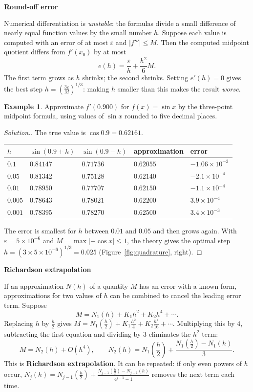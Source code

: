 \documentclass[11pt,a4paper]{article}
\numberwithin{equation}{section}
\theoremstyle{definition}
\newtheorem{exa}[thm]{Example}
\newenvironment{solution}
  {\renewcommand{\qedsymbol}{}\begin{proof}[\textit{Solution}.]}
  {\end{proof}}
\newcommand{\subhead}[1]{%
  \par\medskip\noindent\textbf{#1}\par\nobreak\smallskip}
\begin{document}
\subhead{Round-off error}
Numerical differentiation is \emph{unstable}: the formulas divide a small difference of nearly equal function values by the small number
$h$. Suppose each value is computed with an error of at most $\varepsilon$ and $|f'''|\leq M$. Then the computed midpoint quotient differs from
$f'(x_0)$ by at most
\begin{equation}\label{eq:diffround}
e(h) = \frac{\varepsilon}{h}+\frac{h^2}{6}M .
\end{equation}
The first term grows as $h$ shrinks; the second shrinks. Setting $e'(h) = 0$ gives the best step $h = \left(\frac{3\varepsilon}{M}\right)^{1/3}$: making $h$
smaller than this makes the result \emph{worse}.

\begin{exa}
\label{exa:diffround}
Approximate $f'(0.900)$ for $f(x) = \sin x$ by the three-point midpoint formula, using values of $\sin x$ rounded to five decimal places.
\end{exa}

\begin{solution}
The true value is $\cos0.9 = 0.62161$.
\begin{center}
\begin{tabular}{lllll}
\hline
$h$ & $\sin(0.9+h)$ & $\sin(0.9-h)$ & approximation & error\\
\hline
$0.1$ & $0.84147$ & $0.71736$ & $0.62055$ & $-1.06\times10^{-3}$\\
$0.05$ & $0.81342$ & $0.75128$ & $0.62140$ & $-2.1\times10^{-4}$\\
$0.01$ & $0.78950$ & $0.77707$ & $0.62150$ & $-1.1\times10^{-4}$\\
$0.005$ & $0.78643$ & $0.78021$ & $0.62200$ & $3.9\times10^{-4}$\\
$0.001$ & $0.78395$ & $0.78270$ & $0.62500$ & $3.4\times10^{-3}$\\
\hline
\end{tabular}
\end{center}
The error is smallest for $h$ between $0.01$ and $0.05$ and then grows again. With $\varepsilon = 5\times10^{-6}$ and $M = \max|{-\cos x}|\leq1$,
the theory gives the optimal step $h = (3\times5\times10^{-6})^{1/3} = 0.025$ (Figure~\ref{fig:quadrature}, right).
\end{solution}

\subhead{Richardson extrapolation}
If an approximation $N(h)$ of a quantity $M$ has an error with a known form, approximations for two values of $h$ can be combined to
cancel the leading error term. Suppose
$$M = N_1(h)+K_1h^2+K_2h^4+\cdots .$$
Replacing $h$ by $\frac h2$ gives $M = N_1(\frac h2)+K_1\frac{h^2}{4}+K_2\frac{h^4}{16}+\cdots$. Multiplying this by $4$, subtracting the first equation
and dividing by $3$ eliminates the $h^2$ term:
$$M = N_2(h)+O(h^4),\qquad N_2(h) = N_1\!\left(\frac h2\right)+\frac{N_1(\frac h2)-N_1(h)}{3} .$$
This is \textbf{Richardson extrapolation}. It can be repeated: if only even powers of $h$ occur, $N_{j}(h) = N_{j-1}(\frac h2)+\frac{N_{j-1}(\frac h2)-N_{j-1}(h)}{4^{j-1}-1}$
removes the next term each time.
\end{document}
